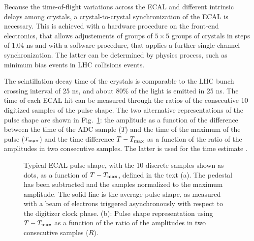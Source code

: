 \documentclass[journal]{IEEEtran}
\begin{document}
Because the time-of-flight variations across the ECAL and different intrinsic delays among crystals, a crystal-to-crystal synchronization of the ECAL is necessary. This is achieved with a hardware procedure on the front-end electronics, that allows adjustements of groups of $5 \times 5$ groups of crystals in steps of 1.04 ns and with a software procedure, that applies a further single channel synchronization. The latter can be determined by physics process, such as minimum bias events in LHC collisions events.

The scintillation decay time of the crystals is comparable to the LHC bunch crossing interval of 25 ns, and about 80\% of the light is emitted in 25 ns. The time of each ECAL hit can be measured through the ratios of the consecutive 10 digitized samples of the pulse shape. The two alternative representations of the pulse shape are shown in Fig.~\ref{fig:pulse_shapes_funcs}: the amplitude as a function of the difference between the time of the ADC sample ($T$) and the time of the maximum of the pulse ($T_{\rm max}$) and the time difference $T-T_{\rm max}$ as a function of the ratio of the amplitudes in two consecutive samples. The latter is used for the time estimate \cite{Chatrchyan:2009aj}.  
%
\begin{figure}[!t]
  \begin{center}
    \caption{Typical ECAL pulse shape, with the 10 discrete samples shown as dots, as a function of $T-T_{\rm max}$, defined in the text (a). The pedestal has been subtracted and the samples normalized to the maximum amplitude. The solid line is the average pulse shape, as measured with a beam of electrons triggered asynchronously with respect to the digitizer clock phase. (b): Pulse shape representation using $T-T_{\rm max}$ as a function of the ratio of the amplitudes in two consecutive samples ($R$). \label{fig:pulse_shapes_funcs}}
  \end{center}
\end{figure}
\end{document}
